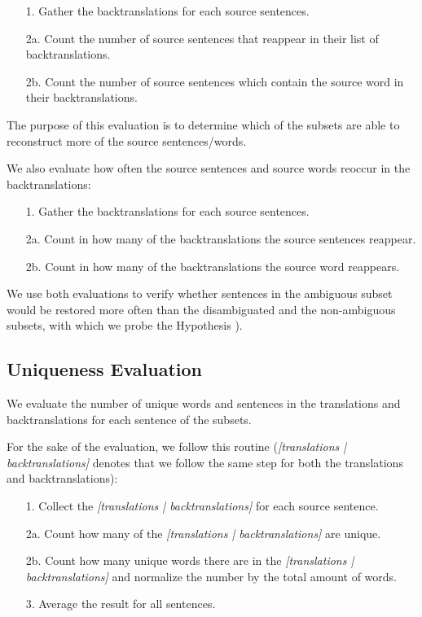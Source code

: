 \begin{enumerate}
    \item[1. ] Gather the backtranslations for each source sentences.
    \item[2a. ] Count the number of source sentences that reappear in their list of backtranslations.
    \item[2b. ] Count the number of source sentences which contain the source word in their backtranslations.
\end{enumerate}

The purpose of this evaluation is to determine which of the subsets are able to reconstruct more of the source sentences/words. 

We also evaluate how often the source sentences and source words reoccur in the backtranslations:

\begin{enumerate}
    \item[1. ] Gather the backtranslations for each source sentences.
    \item[2a. ] Count in how many of the backtranslations the source sentences reappear.
    \item[2b. ] Count in how many of the backtranslations the source word reappears.
\end{enumerate}

We use both evaluations to verify whether sentences in the ambiguous subset would be restored more often than the disambiguated and the non-ambiguous subsets, with which we probe the Hypothesis ).

\subsection{Uniqueness Evaluation}
\label{sec:Base_Experiment:Statistics:Uniqueness}
We evaluate the number of unique words and sentences in the translations and backtranslations for each sentence of the subsets. 

For the sake of the evaluation, we follow this routine (\textit{[translations | backtranslations]} denotes that we follow the same step for both the translations and backtranslations):
\begin{enumerate}
    \item[1. ] Collect the \textit{[translations | backtranslations]} for each source sentence.
    \item[2a. ] Count how many of the \textit{[translations | backtranslations]} are unique. 
    \item[2b. ] Count how many unique words there are in the \textit{[translations | backtranslations]} and normalize the number by the total amount of words. 
    \item[3. ] Average the result for all sentences.
\end{enumerate}

